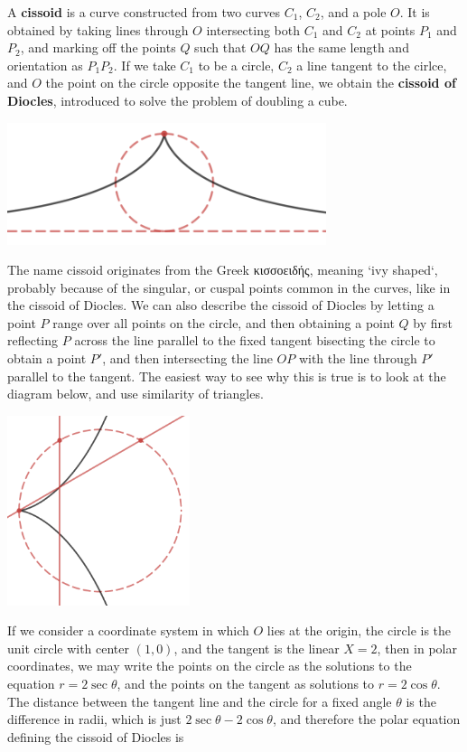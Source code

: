 \begin{example}
    A {\bf cissoid} is a curve constructed from two curves $C_1$, $C_2$, and a pole $O$. It is obtained by taking lines through $O$ intersecting both $C_1$ and $C_2$ at points $P_1$ and $P_2$, and marking off the points $Q$ such that $OQ$ has the same length and orientation as $P_1P_2$. If we take $C_1$ to be a circle, $C_2$ a line tangent to the cirlce, and $O$ the point on the circle opposite the tangent line, we obtain the {\bf cissoid of Diocles}, introduced to solve the problem of doubling a cube.
    \begin{center}
    \includegraphics[width=0.7\textwidth]{algebraicGeometryCissoidDiocles}
    \end{center}
    The name cissoid originates from the Greek \textgreek{κισσοειδής}, meaning `ivy shaped`, probably because of the singular, or cuspal points common in the curves, like in the cissoid of Diocles. We can also describe the cissoid of Diocles by letting a point $P$ range over all points on the circle, and then obtaining a point $Q$ by first reflecting $P$ across the line parallel to the fixed tangent bisecting the circle to obtain a point $P'$, and then intersecting the line $OP$ with the line through $P'$ parallel to the tangent. The easiest way to see why this is true is to look at the diagram below, and use similarity of triangles.
    \begin{center}
        \includegraphics[width=0.4\textwidth]{algebraicGeometryCissoidDiocles2}
    \end{center}
    If we consider a coordinate system in which $O$ lies at the origin, the circle is the unit circle with center $(1,0)$, and the tangent is the linear $X = 2$, then in polar coordinates, we may write the points on the circle as the solutions to the equation $r = 2 \sec \theta$, and the points on the tangent as solutions to $r = 2 \cos \theta$. The distance between the tangent line and the circle for a fixed angle $\theta$ is the difference in radii, which is just $2 \sec \theta - 2 \cos \theta$, and therefore the polar equation defining the cissoid of Diocles is

\end{example}
